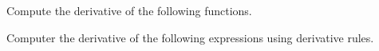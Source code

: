 \begin{questions}
\question Compute the derivative of the following functions.
\begin{multicols}{3}

\end{multicols}

\question Computer the derivative of the following expressions using derivative rules.
\begin{multicols}{2}
\begin{parts}

\end{parts}
\end{multicols}
\end{questions}
